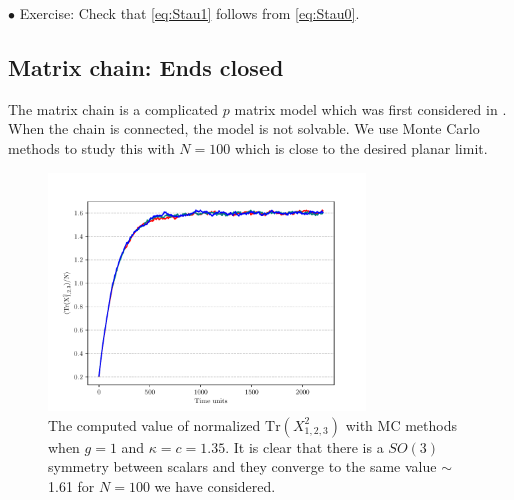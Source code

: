 \documentclass[11pt]{article}
\begin{document}

\begin{mdframed}[backgroundcolor=blue!3]  
	$\bullet$ Exercise: Check that \ref{eq:Stau1} follows from \ref{eq:Stau0}. 
\end{mdframed} 



\subsection{Matrix chain: Ends closed}

The matrix chain is a complicated $p$ matrix model which was first considered in \cite{Chadha:1980ri}. When the chain is connected, the model is not solvable. We use Monte Carlo methods to study this with $N=100$ which is close to the desired planar limit. 


\begin{figure}[htbp] 
	\centering 
	\includegraphics[width=0.75\textwidth]{figs/plot_3MM_chain.pdf}
	\caption{\label{fig:F_app1}The computed value of normalized $\mbox{Tr}(X_{1,2,3}^2)$ with MC methods when $g=1$ and $\kappa=c=1.35$. It is clear that there is a $SO(3)$ symmetry between scalars and they converge to the same value $\sim$ 1.61 for $N = 100$ we have considered.}
\end{figure}
\end{document}
